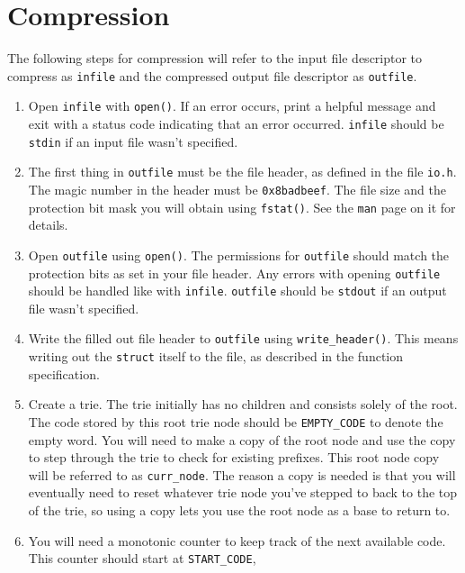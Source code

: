 \section{Compression}\label{sec:compression}

The following steps for compression will refer to the input file descriptor to
compress as \texttt{infile} and the compressed output file descriptor as
\texttt{outfile}.

\begin{enumerate}
    \item Open \texttt{infile} with \texttt{open()}. If an error occurs,
      print a helpful message and exit with a status code indicating
      that an error occurred. \texttt{infile} should be \texttt{stdin}
      if an input file wasn't specified.
    \item The first thing in \texttt{outfile} must be the file header,
      as defined in the file \texttt{io.h}. The magic number in the
      header must be \texttt{0x8badbeef}. The file size and the
      protection bit mask you will obtain using \texttt{fstat()}. See
      the \texttt{man} page on it for details.
    \item Open \texttt{outfile} using \texttt{open()}. The permissions
      for \texttt{outfile} should match the protection bits as set in
      your file header. Any errors with opening \texttt{outfile} should
      be handled like with \texttt{infile}. \texttt{outfile} should be
      \texttt{stdout} if an output file wasn't specified.
    \item Write the filled out file header to \texttt{outfile} using
        \texttt{write\_header()}. This means writing out the \texttt{struct}
        itself to the file, as described in the function specification.
    \item Create a trie. The trie initially has no children and consists
      solely of the root. The code stored by this root trie node should
      be \texttt{EMPTY\_CODE} to denote the empty word. You will need to
      make a copy of the root node and use the copy to step through the
      trie to check for existing prefixes. This root node copy will be
      referred to as \texttt{curr\_node}. The reason a copy is needed is
      that you will eventually need to reset whatever trie node you've
      stepped to back to the top of the trie, so using a copy lets you
      use the root node as a base to return to.
    \item You will need a monotonic counter to keep track of the next
      available code. This counter should start at \texttt{START\_CODE},

\end{enumerate}
